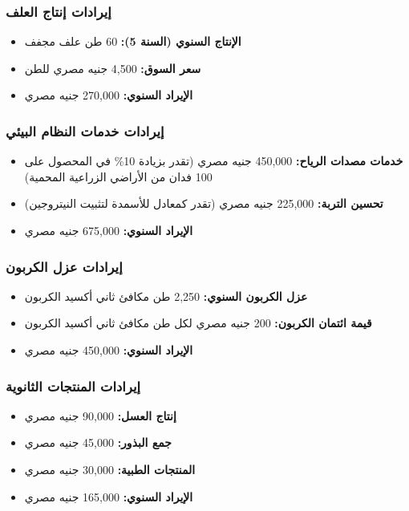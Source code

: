 \subsubsection{إيرادات إنتاج العلف}
\begin{itemize}
    \item \textbf{الإنتاج السنوي (السنة 5):} 60 طن علف مجفف
    \item \textbf{سعر السوق:} 4,500 جنيه مصري للطن
    \item \textbf{الإيراد السنوي:} 270,000 جنيه مصري
\end{itemize}

\subsubsection{إيرادات خدمات النظام البيئي}
\begin{itemize}
    \item \textbf{خدمات مصدات الرياح:} 450,000 جنيه مصري (تقدر بزيادة 10\% في المحصول على 100 فدان من الأراضي الزراعية المحمية)
    \item \textbf{تحسين التربة:} 225,000 جنيه مصري (تقدر كمعادل للأسمدة لتثبيت النيتروجين)
    \item \textbf{الإيراد السنوي:} 675,000 جنيه مصري
\end{itemize}

\subsubsection{إيرادات عزل الكربون}
\begin{itemize}
    \item \textbf{عزل الكربون السنوي:} 2,250 طن مكافئ ثاني أكسيد الكربون
    \item \textbf{قيمة ائتمان الكربون:} 200 جنيه مصري لكل طن مكافئ ثاني أكسيد الكربون
    \item \textbf{الإيراد السنوي:} 450,000 جنيه مصري
\end{itemize}

\subsubsection{إيرادات المنتجات الثانوية}
\begin{itemize}
    \item \textbf{إنتاج العسل:} 90,000 جنيه مصري
    \item \textbf{جمع البذور:} 45,000 جنيه مصري
    \item \textbf{المنتجات الطبية:} 30,000 جنيه مصري
    \item \textbf{الإيراد السنوي:} 165,000 جنيه مصري
\end{itemize}

